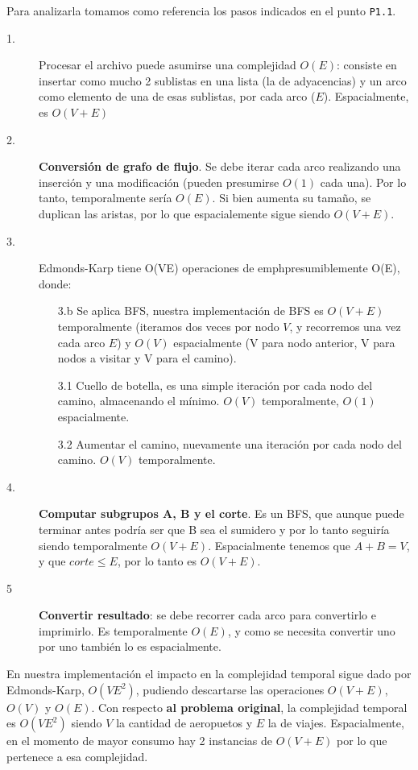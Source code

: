 \documentclass[../tp3_grupo404.tex]{subfiles}
\begin{document}
Para analizarla tomamos como referencia los pasos indicados en el punto \texttt{P1.1}.
\begin{description}
    \item[1.] Procesar el archivo puede asumirse una complejidad $O(E)$: consiste en insertar como mucho
        2 sublistas en una lista (la de adyacencias) y un arco como elemento de una de esas sublistas,
        por cada arco ($E$). Espacialmente, es $O(V+E)$
    \item[2.] \textbf{Conversión de grafo de flujo}. Se debe iterar cada arco realizando una inserción
    y una modificación (pueden presumirse $O(1)$ cada una). Por lo tanto, temporalmente sería $O(E)$.
    Si bien aumenta su tamaño, se duplican las aristas, por lo que espacialemente sigue siendo $O(V+E)$.
    \item[3.] Edmonds-Karp tiene O(VE) operaciones de emph{presumiblemente} O(E), donde:\begin{enumerate}
        \item[3.b] Se aplica BFS, nuestra implementación de BFS es $O(V+E)$ temporalmente (iteramos dos veces
        por nodo $V$, y recorremos una vez cada arco $E$) y $O(V)$ espacialmente
            (V para nodo anterior, V para nodos a visitar y V para el camino).
        \item[3.1] Cuello de botella, es una simple iteración por cada nodo del camino, almacenando el mínimo.
        $O(V)$ temporalmente, $O(1)$ espacialmente.
        \item[3.2] Aumentar el camino, nuevamente una iteración por cada nodo del camino. $O(V)$ temporalmente.
    \end{enumerate}
    \item[4.] \textbf{Computar subgrupos A, B y el corte}. Es un BFS, que aunque puede terminar antes
        podría ser que B sea el sumidero y por lo tanto seguiría siendo temporalmente $O(V+E)$.
        Espacialmente tenemos que $A+B=V$, y que $corte \leq E$, por lo tanto es $O(V+E)$.
    \item[5] \textbf{Convertir resultado}: se debe recorrer cada arco para convertirlo e imprimirlo.
    Es temporalmente $O(E)$, y como se necesita convertir uno por uno también lo es espacialmente.
\end{description}
En nuestra implementación el impacto en la complejidad temporal sigue dado por Edmonds-Karp, $O(VE^2)$,
pudiendo descartarse las operaciones $O(V+E)$, $O(V)$ y $O(E)$. Con respecto \textbf{al problema original}, la complejidad temporal es $O(VE^2)$ siendo $V$ la cantidad
de aeropuetos y $E$ la de viajes.
Espacialmente, en el momento de mayor consumo hay 2 instancias de $O(V+E)$ por lo que pertenece a esa complejidad.

\end{document}
